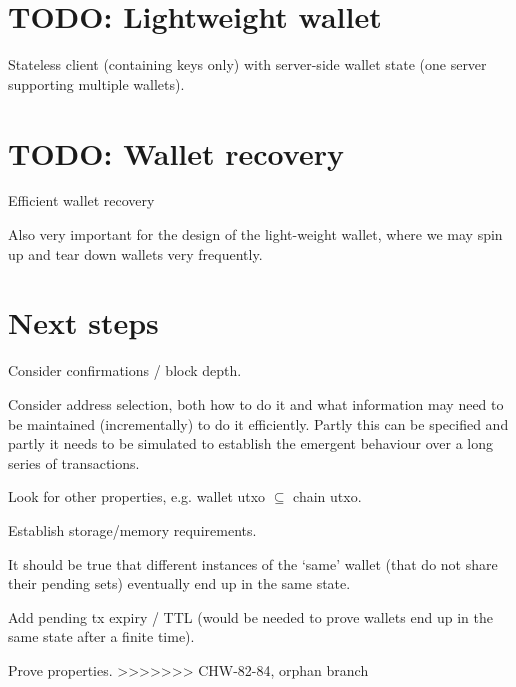 \documentclass{article}
\theoremstyle{definition}{
  \newtheorem{lemma}{Lemma}[section] %
  \newtheorem{definition}[lemma]{Definition}
}
\theoremstyle{theorem}{
  \newtheorem{invariant}[lemma]{Invariant}
  \newtheorem{proofobligation}[lemma]{Proof Obligation}
}
\numberwithin{equation}{lemma}
\begin{document}
\section{TODO: Lightweight wallet}

Stateless client (containing keys only) with server-side wallet state
(one server supporting multiple wallets).

\section{TODO: Wallet recovery}

Efficient wallet recovery

Also very important for the design of the light-weight wallet, where we may
spin up and tear down wallets very frequently.

\section{Next steps}

Consider confirmations / block depth.

Consider address selection, both how to do it and what information may need to
be maintained (incrementally) to do it efficiently. Partly this can be specified
and partly it needs to be simulated to establish the emergent behaviour over a
long series of transactions.

Look for other properties, e.g. wallet utxo $\subseteq$ chain utxo.

Establish storage/memory requirements.

It should be true that different instances of the `same' wallet (that do not share their pending sets) eventually end up in the same state.

Add pending tx expiry / TTL (would be needed to prove wallets end up in the same state after a finite time).

Prove properties.
>>>>>>> CHW-82-84, orphan branch



\end{document}

